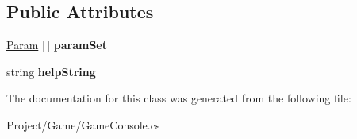 \subsection*{Public Attributes}
\begin{DoxyCompactItemize}
\item 
\mbox{\label{class_lerp2_a_p_i_1_1_game_1_1_param_set_a7805f58beae9b1f9aafbcb233341c212}} 
\hyperlink{class_lerp2_a_p_i_1_1_game_1_1_param}{Param} \mbox{[}$\,$\mbox{]} {\bfseries param\+Set}
\item 
\mbox{\label{class_lerp2_a_p_i_1_1_game_1_1_param_set_a29904c3b8e98ce7bfb16a982d0536f80}} 
string {\bfseries help\+String}
\end{DoxyCompactItemize}


The documentation for this class was generated from the following file\+:\begin{DoxyCompactItemize}
\item 
Project/\+Game/Game\+Console.\+cs\end{DoxyCompactItemize}
